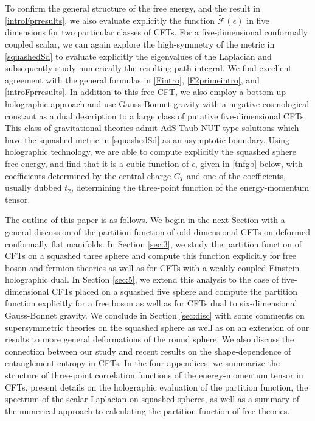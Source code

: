 \documentclass[12pt]{article}
\numberwithin{equation}{section}
\newcommand{\ssc}{\scriptscriptstyle}
\newcommand{\ctt}{C_{\ssc T}}
\begin{document}
To confirm the general structure of the free energy, and the result in \eqref{introFprresults}, we also evaluate explicitly the function $\tilde{\mathcal{F}}(\epsilon)$ in five dimensions for two particular classes of CFTs. For a five-dimensional conformally coupled scalar, we can again explore the high-symmetry of the metric in \eqref{squashedSd} to evaluate explicitly the eigenvalues of the Laplacian and subsequently study numerically the resulting path integral. We find excellent agreement with the general formulas in \eqref{Fintro}, \eqref{F2primeintro}, and \eqref{introFprresults}. In addition to this free CFT, we also employ a bottom-up holographic approach and use Gauss-Bonnet gravity with a negative cosmological constant as a dual description to a large class of putative five-dimensional CFTs. This class of gravitational theories admit AdS-Taub-NUT type solutions which have the squashed metric in \eqref{squashedSd} as an asymptotic boundary. Using holographic technology, we are able to compute explicitly the squashed sphere free energy, and find that it is a cubic function of $\epsilon$, given in \eqref{tnfgb} below, with coefficients determined by the central charge $\ctt$ and one of the coefficients, usually dubbed $t_2$, determining the three-point function of the energy-momentum tensor. 

The outline of this paper is as follows. We begin in the next Section with a general discussion of the partition function of odd-dimensional CFTs on deformed conformally flat manifolds. In Section \ref{sec:3}, we study the partition function of CFTs on a squashed three sphere and compute this function explicitly for free boson and fermion theories as well as for CFTs with a weakly coupled Einstein holographic dual. In Section \ref{sec:5}, we extend this analysis to the case of five-dimensional CFTs placed on a squashed five sphere and compute the partition function explicitly for a free boson as well as for CFTs dual to six-dimensional Gauss-Bonnet gravity. We conclude in Section \ref{sec:disc} with some comments on supersymmetric theories on the squashed sphere as well as on an extension of our results to more general deformations of the round sphere. We also discuss the connection between our study and recent results on the shape-dependence of entanglement entropy in CFTs. In the four appendices, we summarize the structure of three-point correlation functions of the energy-momentum tensor in CFTs, present details on the holographic evaluation of the partition function, the spectrum of the scalar Laplacian on squashed spheres, as well as a summary of the numerical approach to calculating the partition function of free theories.
\end{document}
